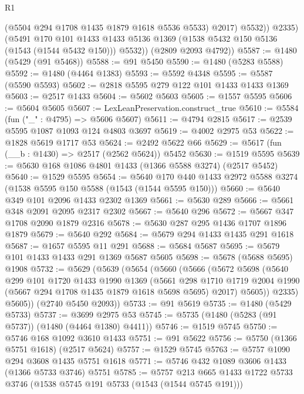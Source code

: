 \begin{lexlean}{R1}
\begin{coremodule}
                (@5504 @294 @1708 @1435 @1879 @1618 @5536 @5533)
                @2017)
              @5532))
          @2335)
        (@5491
          @170
          @101
          @1433
          @1433
          @5136
          @1369
          (@1538 @5432 @150 @5136 (@1543 (@1544 @5432 @150)))
          @5532))
      (@2809 @2093 @4792))
@5587 := @1480 (@5429 (@91 @5468))
@5588 := @91 @5450
@5590 := @1480 (@5283 @5588)
@5592 := @1480 (@4464 @1383)
@5593 := @5592 @4348
@5595 := @5587 (@5590 @5593)
@5602 := @2818 @5595 @279 @122 @101 @1433 @1433 @1369
@5603 := @2517 @1433
@5604 := @5602 @5603
@5605 := @1557 @5595
@5606 := @5604 @5605
@5607 := LexLeanPreservation.construct_true
@5610 := @5584 (fun ("_" : @4795) => @5606 @5607)
@5611 := @4794 @2815
@5617 := @2539 @5595 @1087 @1093 @124 @4803 @3697
@5619 := @4002 @2975 @53
@5622 := @1828 @5619 @1717 @53
@5624 := @2492 @5622 @66
@5629 := @5617 (fun (__b : @1430) => @2517 (@2562 @5624)) @5452
@5630 := @1519 @5595
@5639 := @5630 @168 @1086 @4801 @1433 (@1366 @5588 @3274) (@2517 @5452)
@5640 := @1529 @5595
@5654 := @5640 @170 @440 @1433 @2972 @5588 @3274 (@1538 @5595 @150 @5588 (@1543 (@1544 @5595 @150)))
@5660 := @5640 @349 @101 @2096 @1433 @2302 @1369
@5661 := @5630 @289
@5666 := @5661 @348 @2091 @2095 @2317 @2302
@5667 := @5640 @296
@5672 := @5667 @347 @1708 @2090 @1879 @2316
@5678 := @5630 @287 @295 @1436 @1707 @1896 @1879
@5679 := @5640 @292
@5684 := @5679 @294 @1433 @1435 @291 @1618
@5687 := @1657 @5595 @11 @291
@5688 := @5684 @5687
@5695 := @5679 @101 @1433 @1433 @291 @1369 @5687 @5605
@5698 := @5678 (@5688 @5695) @1908
@5732 := @5629
    (@5639
      (@5654
        (@5660
          (@5666
            (@5672
              @5698
              (@5640
                @299
                @101
                @1720
                @1433
                @1990
                @1369
                (@5661
                  @298
                  @1710
                  @1719
                  @2004
                  @1990
                  (@5667 @294 @1708 @1435 @1879 @1618 @5698 @5695)
                  @2017)
                @5605))
            @2335)
          @5605))
      (@2740 @5450 @2093))
@5733 := @91 @5619
@5735 := @1480 (@5429 @5733)
@5737 := @3699 @2975 @53
@5745 := @5735 (@1480 (@5283 (@91 @5737)) (@1480 (@4464 @1380) @4411))
@5746 := @1519 @5745
@5750 := @5746 @168 @1092 @3610 @1433
@5751 := @91 @5622
@5756 := @5750 (@1366 @5751 @1618) (@2517 @5624)
@5757 := @1529 @5745
@5763 := @5757 @1090 @294 @3608 @1435 @5751 @1618
@5771 := @5746 @432 @1089 @3606 @1433 (@1366 @5733 @3746) @5751
@5785 := @5757 @213 @665 @1433 @1722 @5733 @3746 (@1538 @5745 @191 @5733 (@1543 (@1544 @5745 @191)))

\end{coremodule}
\end{lexlean}
